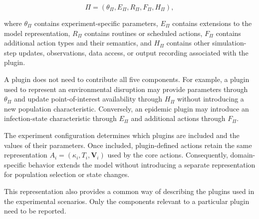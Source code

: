 \[ \Pi = \left( \theta_{\Pi}, E_{\Pi}, R_{\Pi}, F_{\Pi}, H_{\Pi} \right), \] 

where $\theta_{\Pi}$ contains experiment-specific parameters, $E_{\Pi}$ contains extensions to the model representation, $R_{\Pi}$ contains routines or scheduled actions, $F_{\Pi}$ contains additional action types and their semantics, and $H_{\Pi}$ contains other simulation-step updates, observations, data access, or output recording associated with the plugin. 

A plugin does not need to contribute all five components. For example, a plugin used to represent an environmental disruption may provide parameters through $\theta_{\Pi}$ and update point-of-interest availability through $H_{\Pi}$ without introducing a new population characteristic. Conversely, an epidemic plugin may introduce an infection-state characteristic through $E_{\Pi}$ and additional actions through $F_{\Pi}$. 

The experiment configuration determines which plugins are included and the values of their parameters. Once included, plugin-defined actions retain the same representation $A_i=(\kappa_i,T_i,\bm{V}_i)$ used by the core actions. Consequently, domain-specific behavior extends the model without introducing a separate representation for population selection or state changes. 

This representation also provides a common way of describing the plugins used in the experimental scenarios. Only the components relevant to a particular plugin need to be reported.

